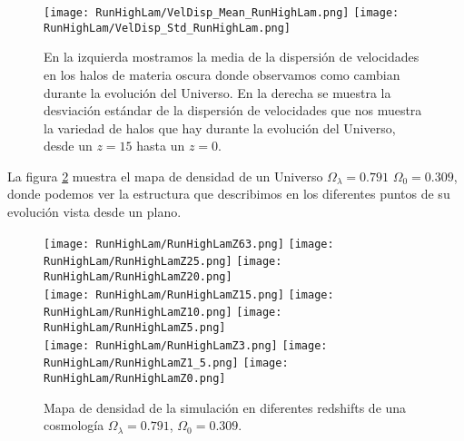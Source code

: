 \begin{figure}[H]
    \centering
    \texttt{[image: RunHighLam/VelDisp\_Mean\_RunHighLam.png]}
    \texttt{[image: RunHighLam/VelDisp\_Std\_RunHighLam.png]}
    \caption[Media y desviación estándar de la dispersión de velocidades]{\footnotesize En la izquierda mostramos la media de la dispersión de velocidades en los halos de materia oscura donde observamos como cambian durante la evolución del Universo. En la derecha se muestra la desviación estándar de la dispersión de velocidades que nos muestra la variedad de halos que hay durante la evolución del Universo, desde un $z=15$ hasta un $z=0$.}
    \label{fig:HighLam-VelDispStats}
\end{figure}

La figura \ref{fig:HighLam-DensityMap} muestra el mapa de densidad de un Universo $\Omega_\lambda = 0.791$ $\Omega_0 = 0.309$, donde podemos ver la estructura que describimos en los diferentes puntos de su evolución vista desde un plano.
\begin{figure}[H]
    \centering

    \texttt{[image: RunHighLam/RunHighLamZ63.png]}   %
    \texttt{[image: RunHighLam/RunHighLamZ25.png]}   %
    \texttt{[image: RunHighLam/RunHighLamZ20.png]}   %
    \\
    \texttt{[image: RunHighLam/RunHighLamZ15.png]}   %
    \texttt{[image: RunHighLam/RunHighLamZ10.png]}   %
    \texttt{[image: RunHighLam/RunHighLamZ5.png]}    %
    \\
    \texttt{[image: RunHighLam/RunHighLamZ3.png]}    %
    \texttt{[image: RunHighLam/RunHighLamZ1\_5.png]}  %
    \texttt{[image: RunHighLam/RunHighLamZ0.png]}    %
    \caption[Mapa de densidad en en diferentes redshift]{ \footnotesize Mapa de densidad de la simulación en diferentes redshifts de una cosmología $\Omega_\lambda = 0.791$, $\Omega_0 = 0.309$. }
    \label{fig:HighLam-DensityMap}
\end{figure}
